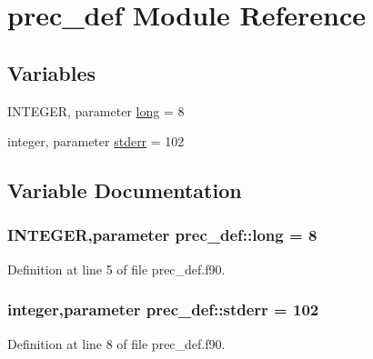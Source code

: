 \hypertarget{namespaceprec__def}{
\section{prec\_\-def Module Reference}
\label{namespaceprec__def}
}
\subsection*{Variables}
\begin{DoxyCompactItemize}
\item 
INTEGER, parameter \hyperlink{namespaceprec__def_a1ad8f831ebb7cc8acabdbab351da0cb4}{long} = 8
\item 
integer, parameter \hyperlink{namespaceprec__def_aedf88710c9c5e9e8fd7397771275f711}{stderr} = 102
\end{DoxyCompactItemize}


\subsection{Variable Documentation}
\hypertarget{namespaceprec__def_a1ad8f831ebb7cc8acabdbab351da0cb4}{
\subsubsection[{long}]{\setlength{\rightskip}{0pt plus 5cm}INTEGER,parameter {\bf prec\_\-def::long} = 8}}
\label{namespaceprec__def_a1ad8f831ebb7cc8acabdbab351da0cb4}


Definition at line 5 of file prec\_\-def.f90.

\hypertarget{namespaceprec__def_aedf88710c9c5e9e8fd7397771275f711}{
\subsubsection[{stderr}]{\setlength{\rightskip}{0pt plus 5cm}integer,parameter {\bf prec\_\-def::stderr} = 102}}
\label{namespaceprec__def_aedf88710c9c5e9e8fd7397771275f711}


Definition at line 8 of file prec\_\-def.f90.

